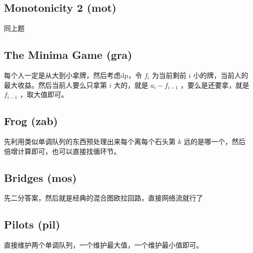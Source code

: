 \documentclass[a4paper,11pt]{article}
\begin{document}
\subsection*{Monotonicity 2 (mot)}
同上题
\subsection*{The Minima Game (gra)}
每个人一定是从大到小拿牌，然后考虑dp，令 $f_i$ 为当前剩前 $i$ 小的牌，当前人的最大收益。然后当前人要么只拿第 $i$ 大的，就是 $a_i - f_{i-1}$ ，要么是还要拿，就是 $f_{i-1}$ ，取大值即可。
\subsection*{Frog (zab)}
先利用类似单调队列的东西预处理出来每个离每个石头第 $k$ 远的是哪一个，然后倍增计算即可，也可以直接找循环节。
\subsection*{Bridges (mos)}
先二分答案，然后就是经典的混合图欧拉回路，直接网络流就行了
\subsection*{Pilots (pil)}
直接维护两个单调队列，一个维护最大值，一个维护最小值即可。
\end{document}
